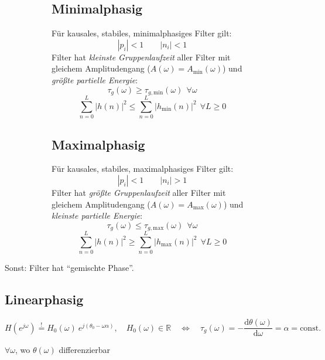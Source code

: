 \documentclass[10pt,a4paper]{article}
\begin{document}
\begin{figure}[H]
	\centering
	\begin{subfigure}[t]{0.48\textwidth}
		\subsection*{Minimalphasig}
		Für kausales, stabiles, minimalphasiges Filter gilt:
		\[
			|p_i| < 1 \qquad |n_i| < 1
		\]
		Filter hat \textit{kleinste Gruppenlaufzeit} aller Filter mit gleichem Amplitudengang ($A(\omega) = A_{\mathrm{min}}(\omega)$) und \textit{größte partielle Energie}:
		\[
			\tau_g(\omega) \geq \tau_{g, \mathrm{min}}(\omega) ~~ \forall \omega
		\]
		\[
			\sum_{n = 0}^L |h(n)|^2 \leq \sum_{n = 0}^L |h_{\mathrm{min}}(n)|^2 ~~ \forall L \geq 0
		\]
	\end{subfigure}
	\hspace{0.02\textwidth}
	\begin{subfigure}[t]{0.48\textwidth}
		\subsection*{Maximalphasig}
		Für kausales, stabiles, maximalphasiges Filter gilt:
		\[
			|p_i| < 1 \qquad |n_i| > 1
		\]
		Filter hat \textit{größte Gruppenlaufzeit} aller Filter mit gleichem Amplitudengang ($A(\omega) = A_{\mathrm{max}}(\omega)$) und \textit{kleinste partielle Energie}:
		\[
			\tau_g(\omega) \leq \tau_{g, \mathrm{max}}(\omega) ~~ \forall \omega
		\]
		\[
			\sum_{n = 0}^L |h(n)|^2 \geq \sum_{n = 0}^L |h_{\mathrm{max}}(n)|^2 ~~ \forall L \geq 0
		\]
	\end{subfigure}
\end{figure}
\raggedright
Sonst: Filter hat ``gemischte Phase''.

\subsection*{Linearphasig}
\[
	H(e^{j\omega}) \overset{!}{=} H_0(\omega) ~ e^{j (\theta_0 - \omega \alpha)}, \quad H_0(\omega) \in \mathbb R
	\quad \Longleftrightarrow \quad
	\tau_g(\omega) = -\frac{\mathrm d \theta(\omega)}{\mathrm d\omega} = \alpha = \mathrm{const.}
\]
\begin{center}
	$\forall \omega$, wo $\theta(\omega)$ differenzierbar
\end{center}

\end{document}
